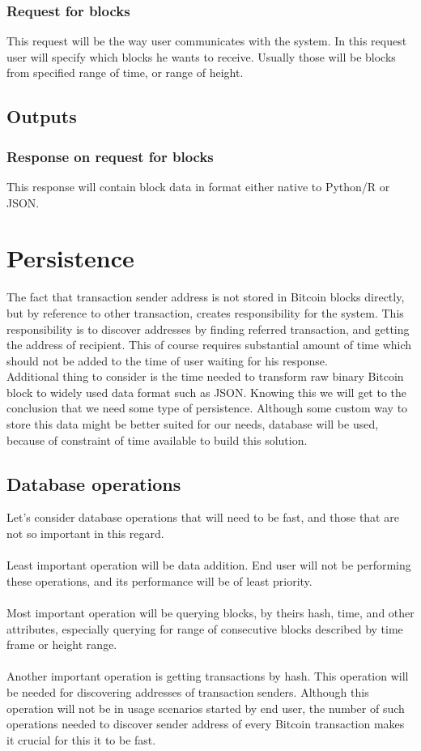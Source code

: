 \documentclass[12pt, en, eng, oneside, final]{mgr}
\begin{document}
\subsubsection{Request for blocks} This request will be the way user communicates with the system. In this request user will specify which blocks he wants to receive. Usually those will be blocks from specified range of time, or range of height.

\subsection{Outputs}
\subsubsection{Response on request for blocks} This response will contain block data in format either native to Python/R or JSON.


\section{Persistence}
The fact that transaction sender address is not stored in Bitcoin blocks directly, but by reference to other transaction, creates responsibility for the system. This responsibility is to discover addresses by finding referred transaction, and getting the address of recipient. This of course requires substantial amount of time which should not be added to the time of user waiting for his response. 
\\
Additional thing to consider is the time needed to transform raw binary Bitcoin block to widely used data format such as JSON. Knowing this we will get to the conclusion that we need some type of persistence. Although some custom way to store this data might be better suited for our needs, database will be used, because of constraint of time available to build this solution.

\subsection{Database operations}
Let's consider database operations that will need to be fast, and those that are not so important in this regard.
\\
\\
Least important operation will be data addition. End user will not be performing these operations, and its performance will be of least priority.
\\
\\
Most important operation will be querying blocks, by theirs hash, time, and other attributes, especially querying for range of consecutive blocks described by time frame or height range.
\\
\\
Another important operation is getting transactions by hash. This operation will be needed for discovering addresses of transaction senders. Although this operation will not be in usage scenarios started by end user, the number of such operations needed to discover sender address of every Bitcoin transaction makes it crucial for this it to be fast.
\end{document}
